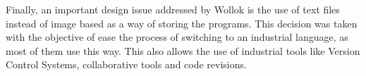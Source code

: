 Finally, an important design issue addressed by Wollok is the use of text files instead of image based as a way of storing the programs. This decision was taken with the objective of ease the process of switching to an industrial language, as most of them use this way. This also allows the use of industrial tools like Version Control Systems, collaborative tools and code revisions.

